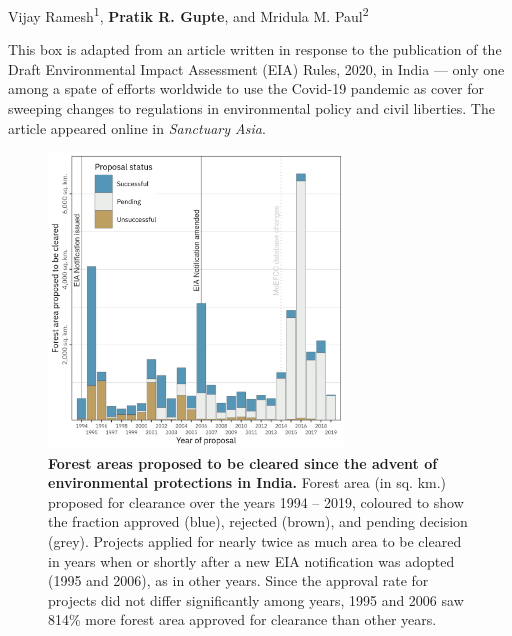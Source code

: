 
\pagestyle{plain}

\begingroup

\let\clearpage\relax
\let\cleardoublepage\relax
\let\cleardoublepage\relax

\label{box:clearances}

\noindent Vijay Ramesh\textsuperscript{1}, \textbf{Pratik R. Gupte}, and Mridula M. Paul\textsuperscript{2}


\medskip

\noindent {{$\Delta$}} {\footnotesize This box is adapted from an article written in response to the publication of the Draft Environmental Impact Assessment (EIA) Rules, 2020, in India --- only one among a spate of efforts worldwide to use the Covid-19 pandemic as cover for sweeping changes to regulations in environmental policy and civil liberties.
The article appeared online in \textit{Sanctuary Asia}.}

\medskip
\footnotesize

\begin{figure}[h!]
	\centering
	\includegraphics[width=0.7\textwidth]{figures/boxes/clearances.png}
	\caption*{
		\textbf{Forest areas proposed to be cleared since the advent of environmental protections in India.} 
		Forest area (in sq. km.) proposed for clearance over the years 1994 -- 2019, coloured to show the fraction approved (blue), rejected (brown), and pending decision (grey). Projects applied for nearly twice as much area to be cleared in years when or shortly after a new EIA notification was adopted (1995 and 2006), as in other years. Since the approval rate for projects did not differ significantly among years, 1995 and 2006 saw 814\% more forest area approved for clearance than other years.
	}
	\label{fig_box_clearances}
\end{figure}

